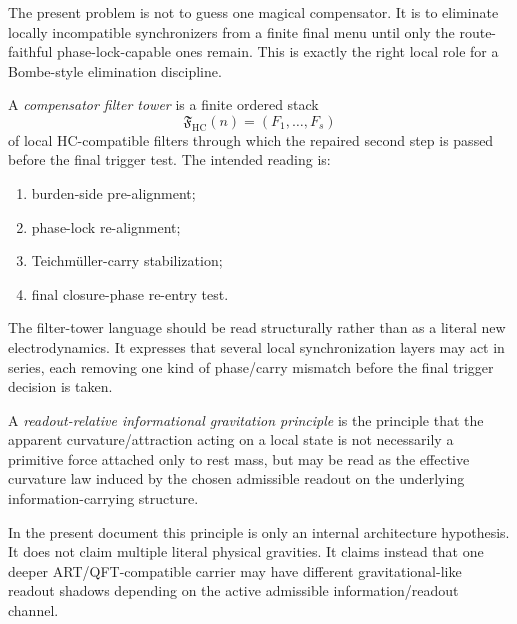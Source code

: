 \begin{remark}
\label{rem:why-the-bombe-idea-fits-here}
The present problem is not to guess one magical compensator. It is to eliminate locally incompatible synchronizers from a finite final menu until only the route-faithful phase-lock-capable ones remain. This is exactly the right local role for a Bombe-style elimination discipline.
\end{remark}

\begin{definition}
\label{def:compensator-filter-tower}
A \emph{compensator filter tower} is a finite ordered stack
\[
 \mathfrak F_{\mathrm{HC}}(n)=
 (F_1,\dots,F_s)
\]
of local HC-compatible filters through which the repaired second step is passed before the final trigger test. The intended reading is:
\begin{enumerate}[leftmargin=2em,label=(\roman*)]
 \item burden-side pre-alignment;
 \item phase-lock re-alignment;
 \item Teichm\"uller-carry stabilization;
 \item final closure-phase re-entry test.
\end{enumerate}
\end{definition}

\begin{remark}
\label{rem:filter-tower-and-electromagnetic-analogy}
The filter-tower language should be read structurally rather than as a literal new electrodynamics. It expresses that several local synchronization layers may act in series, each removing one kind of phase/carry mismatch before the final trigger decision is taken.
\end{remark}

\begin{definition}
\label{def:readout-relative-informational-gravitation-principle}
A \emph{readout-relative informational gravitation principle} is the principle that the apparent curvature/attraction acting on a local state is not necessarily a primitive force attached only to rest mass, but may be read as the effective curvature law induced by the chosen admissible readout on the underlying information-carrying structure.
\end{definition}

\begin{remark}
\label{rem:how-far-this-principle-should-be-claimed}
In the present document this principle is only an internal architecture hypothesis. It does not claim multiple literal physical gravities. It claims instead that one deeper ART/QFT-compatible carrier may have different gravitational-like readout shadows depending on the active admissible information/readout channel.
\end{remark}

